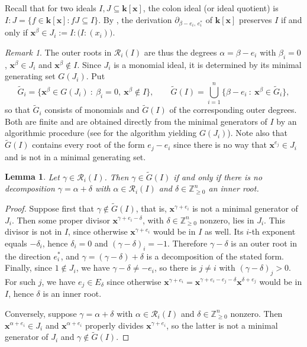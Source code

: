 \documentclass[11pt,letterpaper,reqno]{amsart}
\newtheorem{lemma}[lemma]{Lemma}
\theoremstyle{remark}
\newtheorem{remark}[remark]{Remark}
\theoremstyle{definition}
\def\XX{\mathbf{x}}
\newcommand{\KK}[0]{\ensuremath{\mathbf{k}}}
\newcommand{\ZZ}[0]{\ensuremath{\mathbb{Z}}}
\newcommand{\R}{\mathcal R}
\begin{document}
Recall that for two ideals $I,J\subseteq\KK[\XX]$, the colon ideal
(or ideal quotient) is $I:J=\{f\in\KK[\XX] : fJ\subseteq I\}$.
By \cite[Theorem~2.2.1]{B95}, the derivation
$\partial_{\beta-e_i,\,e_i^*}$ of $\KK[\XX]$ preserves $I$ if and only if
$\XX^\beta\in J_i:=I:\bigl(I:(x_i)\bigr)$.

\begin{remark}\label{rmk:outer-colon}
The outer roots in $\R_i(I)$ are thus the degrees $\alpha=\beta-e_i$ with $\beta_i=0$,
$\XX^\beta\in J_i$ and $\XX^\beta\notin I$. Since $J_i$ is a monomial ideal, it is determined by its minimal
generating set $G(J_i)$. Put
$$
\widetilde G_i=\bigl\{\XX^\beta\in G(J_i)\ :\
\beta_i=0,\ \XX^\beta\notin I\bigr\},
\qquad
\widetilde G(I)=\bigcup_{i=1}^n\bigl\{\beta-e_i\ :\
\XX^\beta\in\widetilde G_i\bigr\},
$$
so that $\widetilde G_i$ consists of monomials and $\widetilde G(I)$ of the
corresponding outer degrees. Both are finite and are obtained directly from the minimal generators of $I$ by an algorithmic procedure (see \cite[Proposition~1.2.2]{HH11} for the algorithm yielding $G(J_i)$). Note also that $\tilde G(I)$ contains every root of the form $e_j-e_i$ since there is no way that $\XX^{e_j}\in J_i$ and is not in a minimal generating set.
\end{remark}

\begin{lemma}\label{lem:outer-minimal}
Let $\gamma\in\R_i(I)$. Then
$\gamma\in\widetilde G(I)$ if and only if there is no decomposition
$\gamma=\alpha+\delta$ with $\alpha\in\R_i(I)$ and
$\delta\in\ZZ^n_{\geq 0}$ an inner root.
\end{lemma}

\begin{proof}
Suppose first that $\gamma\notin\widetilde G(I)$, that is,
$\XX^{\gamma+e_i}$ is not a minimal generator of $J_i$. Then some
proper divisor $\XX^{\gamma+e_i-\delta}$, with
$\delta\in\ZZ^n_{\geq 0}$ nonzero, lies in $J_i$. This divisor is not in
$I$, since otherwise $\XX^{\gamma+e_i}$ would be in $I$
as well. Its $i$-th exponent equals $-\delta_i$, hence $\delta_i=0$ and
$(\gamma-\delta)_i=-1$. Therefore $\gamma-\delta$ is an outer root in the direction $e_i^*$, and $\gamma=(\gamma-\delta)+\delta$ is a decomposition of the stated form. Finally, since $1\notin J_i$, we have $\gamma-\delta\neq -e_i$, so there is $j\neq i$ with $(\gamma-\delta)_j>0$. For such $j$, we have $e_j\in E_{\delta}$ since otherwise $\XX^{\gamma+e_i}=\XX^{\gamma+e_i-e_j-\delta}\XX^{\delta+e_j}$ would be in $I$, hence $\delta$ is an inner root.

Conversely, suppose $\gamma=\alpha+\delta$ with $\alpha\in\R_i(I)$ and $\delta\in\ZZ^n_{\geq 0}$ nonzero. Then
$\XX^{\alpha+e_i}\in J_i$ and $\XX^{\alpha+e_i}$ properly
divides $\XX^{\gamma+e_i}$, so the latter is not a minimal
generator of $J_i$ and $\gamma\notin\widetilde G(I)$.
\end{proof}
\end{document}
